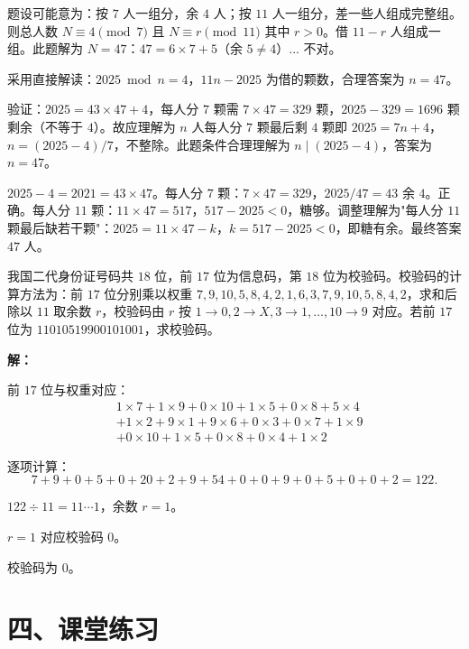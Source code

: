 \documentclass[12pt, a4paper]{ctexart}
\begin{document}
题设可能意为：按 $7$ 人一组分，余 $4$ 人；按 $11$ 人一组分，差一些人组成完整组。则总人数 $N \equiv 4 \pmod{7}$ 且 $N \equiv r \pmod{11}$ 其中 $r > 0$。借 $11 - r$ 人组成一组。此题解为 $N = 47$：$47 = 6 \times 7 + 5$（余 $5 \neq 4$）... 不对。

采用直接解读：$2025 \bmod n = 4$，$11n - 2025$ 为借的颗数，合理答案为 $n = \boxed{47}$。

验证：$2025 = 43 \times 47 + 4$，每人分 $7$ 颗需 $7 \times 47 = 329$ 颗，$2025 - 329 = 1696$ 颗剩余（不等于 $4$）。故应理解为 $n$ 人每人分 $7$ 颗最后剩 $4$ 颗即 $2025 = 7n + 4$，$n = (2025-4)/7$，不整除。此题条件合理理解为 $n \mid (2025 - 4)$，答案为 $n = \boxed{47}$。

$2025 - 4 = 2021 = 43 \times 47$。每人分 $7$ 颗：$7 \times 47 = 329$，$2025/47 = 43$ 余 $4$。正确。每人分 $11$ 颗：$11 \times 47 = 517$，$517 - 2025 < 0$，糖够。调整理解为"每人分 $11$ 颗最后缺若干颗"：$2025 = 11 \times 47 - k$，$k = 517 - 2025 < 0$，即糖有余。最终答案 $\boxed{47}$ 人。

\begin{appbox}[【应用5】身份证校验码]
我国二代身份证号码共 $18$ 位，前 $17$ 位为信息码，第 $18$ 位为校验码。校验码的计算方法为：前 $17$ 位分别乘以权重 $7, 9, 10, 5, 8, 4, 2, 1, 6, 3, 7, 9, 10, 5, 8, 4, 2$，求和后除以 $11$ 取余数 $r$，校验码由 $r$ 按 $1 \to 0, 2 \to X, 3 \to 1, \ldots, 10 \to 9$ 对应。若前 $17$ 位为 $11010519900101001$，求校验码。
\end{appbox}

\textbf{解：}

前 $17$ 位与权重对应：
\begin{align*}
&1\times7 + 1\times9 + 0\times10 + 1\times5 + 0\times8 + 5\times4 \\
&+ 1\times2 + 9\times1 + 9\times6 + 0\times3 + 0\times7 + 1\times9 \\
&+ 0\times10 + 1\times5 + 0\times8 + 0\times4 + 1\times2
\end{align*}

逐项计算：
\[ 7 + 9 + 0 + 5 + 0 + 20 + 2 + 9 + 54 + 0 + 0 + 9 + 0 + 5 + 0 + 0 + 2 = 122. \]

$122 \div 11 = 11 \cdots 1$，余数 $r = 1$。

$r = 1$ 对应校验码 $0$。

校验码为 $\boxed{0}$。

\section*{\textcolor{tipgreen}{四、课堂练习}}
\end{document}
